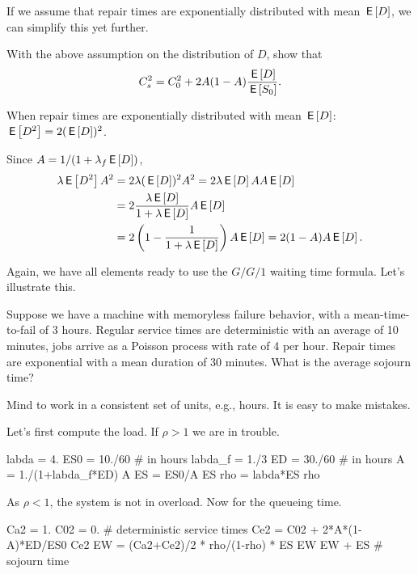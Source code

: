 If we assume that repair times are exponentially distributed with mean $\,\mathsf{E}\left[D\right]$, we can simplify this yet further.

\begin{exercise}[\faCalculator]
With the above assumption on the distribution of $D$, show that
  \begin{equation*}
    C_s^2 = C_0^2 + 2 A(1-A) \frac{\,\mathsf{E}\left[D\right]}{\,\mathsf{E}\left[S_0\right]}.
  \end{equation*}
\begin{solution} 
When repair times are exponentially distributed with mean $\,\mathsf{E}\left[D\right]$:  $\,\mathsf{E}\left[D^2\right]=2(\,\mathsf{E}\left[D\right])^2$. 

Since $A=1/(1+\lambda_f \,\mathsf{E}\left[D\right])$, 
  \begin{equation*}
    \begin{split}
    \lambda \,\mathsf{E}\left[D^2\right] A^2 
&= 2\lambda (\,\mathsf{E}\left[D\right])^2 A^2 = 2 \lambda \,\mathsf{E}\left[D\right] A A \,\mathsf{E}\left[D\right] \\
&= 2 \frac{\lambda \,\mathsf{E}\left[D\right] }{1+\lambda \,\mathsf{E}\left[D\right]} A \,\mathsf{E}\left[D\right] \\
&= 2 \left(1-\frac{1}{1+\lambda \,\mathsf{E}\left[D\right]}\right) A \,\mathsf{E}\left[D\right]  = 2(1-A)A \,\mathsf{E}\left[D\right].
    \end{split}
  \end{equation*}
\end{solution}
\end{exercise}

Again, we have all elements ready to use the $G/G/1$ waiting time formula. Let's illustrate this. 

\begin{exercise}[\faPhoto]
  Suppose we have a machine with memoryless failure behavior, with a mean-time-to-fail of $3$ hours. Regular service times are deterministic with an average of 10 minutes, jobs arrive as a Poisson process with rate of 4 per hour.  Repair times are exponential with a mean duration of 30 minutes. What is the average sojourn time?
  \begin{hint}
    Mind to work in a consistent set of units, e.g., hours. It is easy to make mistakes. 
  \end{hint}
  \begin{solution}
Let's first compute the load. If $\rho>1$ we are in trouble.
    \begin{pyconsole}
labda = 4.
ES0 = 10./60 # in hours
labda_f = 1./3
ED = 30./60 # in hours
A = 1./(1+labda_f*ED)
A
ES = ES0/A
ES
rho = labda*ES
rho
    \end{pyconsole}
As $\rho<1$, the system is not in overload. Now for the queueing time.
\begin{pyconsole}
Ca2 = 1.
C02 = 0. # deterministic service times
Ce2 = C02 + 2*A*(1-A)*ED/ES0
Ce2
EW = (Ca2+Ce2)/2 * rho/(1-rho) * ES
EW
EW + ES # sojourn time
\end{pyconsole}
  \end{solution}
\end{exercise}

